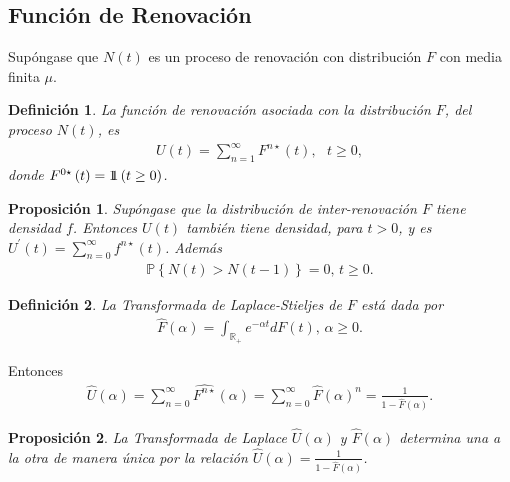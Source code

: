 \documentclass{article}
\newtheorem{Def}{Definición}[section]
\newtheorem{Prop}{Proposición}[section]
\newcommand{\rea}{\mathbb{R}}
\newcommand{\prob}{\mathbb{P}}
\newcommand{\indora}{\mbox{$1$\hspace{-0.8ex}$1$}}
\numberwithin{equation}{section}
\begin{document}
\subsection*{Funci\'on de Renovaci\'on}

Sup\'ongase que $N\left(t\right)$ es un proceso de renovaci\'on con distribuci\'on $F$ con media finita $\mu$.

\begin{Def}
La funci\'on de renovaci\'on asociada con la distribuci\'on $F$, del proceso $N\left(t\right)$, es
\begin{eqnarray}
U\left(t\right)=\sum_{n=1}^{\infty}F^{n\star}\left(t\right),\textrm{   }t\geq0,
\end{eqnarray}
donde $F^{0\star}\left(t\right)=\indora\left(t\geq0\right)$.
\end{Def}

\begin{Prop}
Sup\'ongase que la distribuci\'on de inter-renovaci\'on $F$ tiene densidad $f$. Entonces $U\left(t\right)$ tambi\'en tiene densidad, para $t>0$, y es $U^{'}\left(t\right)=\sum_{n=0}^{\infty}f^{n\star}\left(t\right)$. Adem\'as
\begin{eqnarray}
\prob\left\{N\left(t\right)>N\left(t-1\right)\right\}=0\textrm{,   }t\geq0.
\end{eqnarray}
\end{Prop}

\begin{Def}
La Transformada de Laplace-Stieljes de $F$ est\'a dada por
\begin{eqnarray*}
\hat{F}\left(\alpha\right)=\int_{\rea_{+}}e^{-\alpha t}dF\left(t\right)\textrm{,  }\alpha\geq0.
\end{eqnarray*}
\end{Def}

Entonces
\begin{eqnarray}
\hat{U}\left(\alpha\right)=\sum_{n=0}^{\infty}\hat{F^{n\star}}\left(\alpha\right)=\sum_{n=0}^{\infty}\hat{F}\left(\alpha\right)^{n}=\frac{1}{1-\hat{F}\left(\alpha\right)}.
\end{eqnarray}

\begin{Prop}
La Transformada de Laplace $\hat{U}\left(\alpha\right)$ y $\hat{F}\left(\alpha\right)$ determina una a la otra de manera \'unica por la relaci\'on $\hat{U}\left(\alpha\right)=\frac{1}{1-\hat{F}\left(\alpha\right)}$.
\end{Prop}
\end{document}
